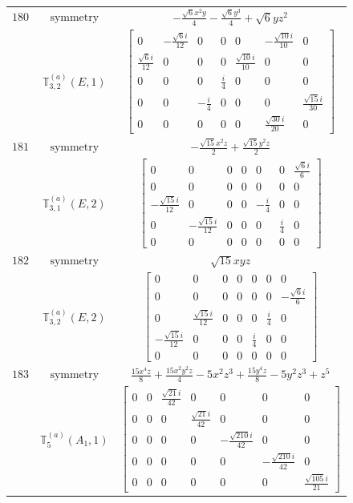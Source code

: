 \documentclass[fleqn,8pt,landscape]{jsarticle}
\begin{document}
\begin{longtable}{ccc}
$ 180 $ & $ \text{symmetry} $ & $ - \frac{\sqrt{6} x^{2} y}{4} - \frac{\sqrt{6} y^{3}}{4} + \sqrt{6} y z^{2} $ \\
$  $ & $ \mathbb{T}_{3,2}^{(a)}(E,1) $ & $ \begin{bmatrix} 0 & - \frac{\sqrt{6} i}{12} & 0 & 0 & 0 & - \frac{\sqrt{10} i}{10} & 0 \\ \frac{\sqrt{6} i}{12} & 0 & 0 & 0 & \frac{\sqrt{10} i}{10} & 0 & 0 \\ 0 & 0 & 0 & \frac{i}{4} & 0 & 0 & 0 \\ 0 & 0 & - \frac{i}{4} & 0 & 0 & 0 & \frac{\sqrt{15} i}{30} \\ 0 & 0 & 0 & 0 & 0 & \frac{\sqrt{30} i}{20} & 0 \end{bmatrix} $ \\ \hline
$ 181 $ & $ \text{symmetry} $ & $ - \frac{\sqrt{15} x^{2} z}{2} + \frac{\sqrt{15} y^{2} z}{2} $ \\
$  $ & $ \mathbb{T}_{3,1}^{(a)}(E,2) $ & $ \begin{bmatrix} 0 & 0 & 0 & 0 & 0 & 0 & \frac{\sqrt{6} i}{6} \\ 0 & 0 & 0 & 0 & 0 & 0 & 0 \\ - \frac{\sqrt{15} i}{12} & 0 & 0 & 0 & - \frac{i}{4} & 0 & 0 \\ 0 & - \frac{\sqrt{15} i}{12} & 0 & 0 & 0 & \frac{i}{4} & 0 \\ 0 & 0 & 0 & 0 & 0 & 0 & 0 \end{bmatrix} $ \\ \hline
$ 182 $ & $ \text{symmetry} $ & $ \sqrt{15} x y z $ \\
$  $ & $ \mathbb{T}_{3,2}^{(a)}(E,2) $ & $ \begin{bmatrix} 0 & 0 & 0 & 0 & 0 & 0 & 0 \\ 0 & 0 & 0 & 0 & 0 & 0 & - \frac{\sqrt{6} i}{6} \\ 0 & \frac{\sqrt{15} i}{12} & 0 & 0 & 0 & \frac{i}{4} & 0 \\ - \frac{\sqrt{15} i}{12} & 0 & 0 & 0 & \frac{i}{4} & 0 & 0 \\ 0 & 0 & 0 & 0 & 0 & 0 & 0 \end{bmatrix} $ \\ \hline
$ 183 $ & $ \text{symmetry} $ & $ \frac{15 x^{4} z}{8} + \frac{15 x^{2} y^{2} z}{4} - 5 x^{2} z^{3} + \frac{15 y^{4} z}{8} - 5 y^{2} z^{3} + z^{5} $ \\
$  $ & $ \mathbb{T}_{5}^{(a)}(A_{1},1) $ & $ \begin{bmatrix} 0 & 0 & \frac{\sqrt{21} i}{42} & 0 & 0 & 0 & 0 \\ 0 & 0 & 0 & \frac{\sqrt{21} i}{42} & 0 & 0 & 0 \\ 0 & 0 & 0 & 0 & - \frac{\sqrt{210} i}{42} & 0 & 0 \\ 0 & 0 & 0 & 0 & 0 & - \frac{\sqrt{210} i}{42} & 0 \\ 0 & 0 & 0 & 0 & 0 & 0 & \frac{\sqrt{105} i}{21} \end{bmatrix} $ \\ \hline

\end{longtable}
\end{document}
